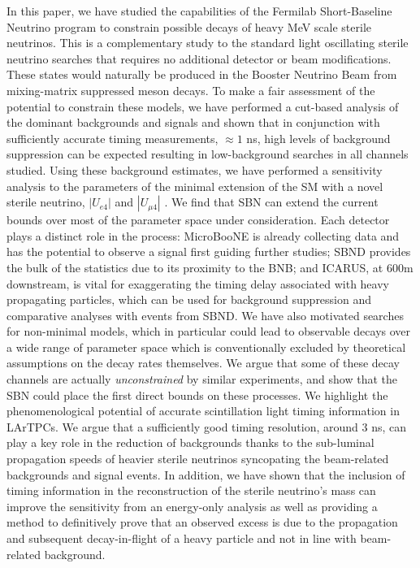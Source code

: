 \documentclass[11pt, a4paper]{article}
\begin{document}
In this paper, we have studied the capabilities of the Fermilab Short-Baseline
Neutrino program to constrain possible decays of heavy MeV scale sterile
neutrinos. This is a complementary study to the standard light oscillating
sterile neutrino searches that requires no additional detector or beam modifications.
These states would naturally be produced in the Booster Neutrino Beam from
mixing-matrix suppressed meson decays. To make a fair assessment of the
potential to constrain these models, we have performed a cut-based analysis of
the dominant backgrounds and signals and shown that in conjunction with
sufficiently accurate timing measurements, $\approx 1$ ns, high levels of
background suppression can be expected resulting in low-background searches in
all channels studied. Using these background estimates, we have performed a
sensitivity analysis to the parameters of the minimal extension of the SM with
a novel sterile neutrino, $|U_{e4}|$ and $|U_{\mu4}|$ . 
%
We find that SBN can extend the current bounds over most of the parameter space
under consideration. Each detector plays a distinct role in the process:
MicroBooNE is already collecting data and has the potential to observe a signal
first guiding further studies; SBND provides the bulk of the statistics due to
its proximity to the BNB; and ICARUS, at 600m downstream, is vital for
exaggerating the timing delay associated with heavy propagating particles,
which can be used for background suppression and comparative analyses with
events from SBND.
%
We have also motivated searches for non-minimal models, which in particular
could lead to observable decays over a wide range of parameter space which is
conventionally excluded by theoretical assumptions on the decay rates
themselves. We argue that some of these decay channels are actually
\emph{unconstrained} by similar experiments, and show that the SBN could place
the first direct bounds on these processes.
%
We highlight the phenomenological potential of accurate scintillation light
timing information in LArTPCs. We argue that a sufficiently good timing
resolution, around $3$ ns, can play a key role in the reduction of backgrounds
thanks to the sub-luminal propagation speeds of heavier sterile neutrinos
syncopating the beam-related backgrounds and signal events. In addition, we
have shown that the inclusion of timing information in the reconstruction of
the sterile neutrino's mass can improve the sensitivity from an energy-only analysis as
well as providing a method to definitively prove that an observed excess is due
to the propagation and subsequent decay-in-flight of a heavy particle and not
in line with beam-related background.
%
\end{document}
